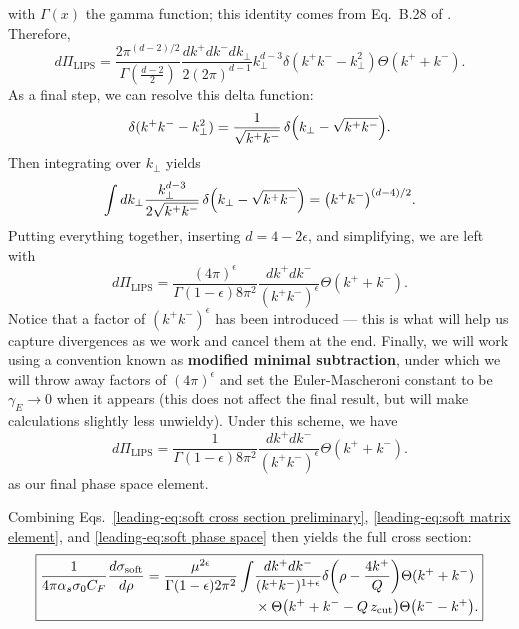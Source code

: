 \documentclass[../thesis.tex]{subfiles}
\providecommand{\zcut}{z_\mathrm{{cut}}}
\providecommand{\LIPS}{\mathrm{LIPS}}
\begin{document}
	with $\Gamma(x)$ the gamma function; this identity comes from Eq.\ B.28 of \cite{schwartz_quantum_2014}.
	Therefore,
	\begin{equation}
		d\Pi_\LIPS = \frac{2\pi^{(d-2)/2}}{\Gamma(\frac{d-2}{2})} \frac{dk^+ dk^- dk_\perp}{2(2\pi)^{d-1}} k_\perp^{d-3} \delta(k^+ k^- - k_\perp^2)\Theta(k^+ + k^-).
	\end{equation}
	As a final step, we can resolve this delta function:
	\begin{equation}
		\delta(k^+ k^- - k_\perp^2) = \frac{1}{\sqrt{k^+ k^-}}\,\delta\qty(k_\perp - \sqrt{k^+ k^-}).
	\end{equation}
	Then integrating over $k_\perp$ yields
	\begin{equation}
		\int dk_\perp \frac{k_\perp^{d-3}}{2\sqrt{k^+ k^-}}\,\delta\qty(k_\perp - \sqrt{k^+ k^-}) = \qty(k^+ k^-)^{(d-4)/2}.
	\end{equation}
	Putting everything together, inserting $d = 4 - 2\epsilon$, and simplifying, we are left with
	\begin{equation}
		d\Pi_\LIPS = \frac{(4\pi)^{\epsilon}}{\Gamma(1-\epsilon)8\pi^2}\frac{dk^+ dk^-}{(k^+ k^-)^\epsilon} \Theta(k^+ + k^-).
	\end{equation}
	Notice that a factor of $(k^+ k^-)^\epsilon$ has been introduced --- this is what will help us capture divergences as we work and cancel them at the end. Finally, we will work using a convention known as \textbf{modified minimal subtraction}, under which we will throw away factors of $(4\pi)^\epsilon$ and set the Euler-Mascheroni constant to be $\gamma_E \to 0$ when it appears (this does not affect the final result, but will make calculations slightly less unwieldy). Under this scheme, we have
	\begin{equation}\label{leading-eq:soft phase space}
		d\Pi_\LIPS = \frac{1}{\Gamma(1-\epsilon)8\pi^2}\frac{dk^+ dk^-}{(k^+ k^-)^\epsilon} \Theta(k^+ + k^-).
	\end{equation}
	as our final phase space element.

	Combining Eqs.~\ref{leading-eq:soft cross section preliminary}, \ref{leading-eq:soft matrix element}, and \ref{leading-eq:soft phase space} then yields the full cross section:
	\begin{equation}\label{leading-eq:soft cross section integral}
	\boxed{
	\begin{aligned}
		\frac{1}{4\pi\alpha_s\sigma_0 C_F}\frac{d\sigma_{\text{soft}}}{d\rho} = \frac{\mu^{2\epsilon}}{\Gamma(1-\epsilon)2\pi^2}\int &\frac{dk^+ dk^-}{(k^+ k^-)^{1+\epsilon}} \delta\qty(\rho - \frac{4k^+}{Q}) \Theta(k^+ + k^-) \\
		&\times \Theta\qty(k^+ + k^- - Q\,\zcut)\Theta\qty(k^- - k^+).
	\end{aligned}
	}
	\end{equation}
\end{document}
